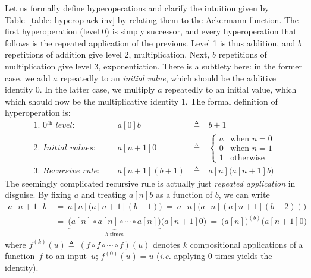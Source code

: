 Let us formally define hyperoperations and clarify the intuition
given by Table~\ref{table: hyperop-ack-inv} by relating them to
the Ackermann function.
The first hyperoperation (level 0) is simply successor, and
every hyperoperation that follows is the repeated application of the previous.
Level 1 is thus addition, and $b$ repetitions of addition
give level 2, multiplication. Next, $b$ repetitions of
multiplication give level 3, exponentiation.
There is a subtlety here: in the former case, we add $a$
repeatedly to an \emph{initial value}, which should be the additive identity $0$.
In the latter case, we multiply $a$ repeatedly to an initial value, which
which should now be the multiplicative identity $1$. The formal definition of hyperoperation is:
\begin{equation}
\label{eq:hyper}
\begin{array}{lrcl}
\textit{1. 0$^{\textit{th}}$ level: } & a[0]b & ~ \triangleq ~ & b + 1 \\
\textit{2. Initial values: } & a[n+1]0 & ~ \triangleq ~ &
  \begin{cases}
    a & \text{when } n = 0 \\
    0 & \text{when } n = 1 \\
    1 & \text{otherwise}
  \end{cases} \\
\textit{3. Recursive rule: } \quad & a[n+1](b+1) & ~ \triangleq ~ & a[n]\big(a[n+1]b\big)
\end{array}
\end{equation}
The seemingly complicated recursive rule is actually just \emph{repeated application} in disguise. By fixing $a$ and treating $a[n]b$ as a function of $b$, we can write
\begin{equation*}
\begin{array}{lll}
a[n+1]b ~& = ~ a[n]\big(a[n+1](b-1)\big) ~ = ~ a[n]\big(a[n](a[n+1](b-2))\big) \\
& = ~ \underbrace{\big( a[n]\circ a[n]\circ \cdots \circ a[n] \big)}_{b \text{ times}} \big(a[n+1]0\big)  ~ = ~ \big(a[n]\big)^{(b)}\big(a[n+1]0\big)
\end{array}
\end{equation*}
where $f^{(k)}(u) \triangleq ~ (f\circ f\circ \cdots \circ f)(u)$ denotes $k$ compositional applications of a function~$f$ to an
input~$u$; $f^{(0)}(u) = u$ (\emph{i.e.} applying $0$ times yields the identity).

